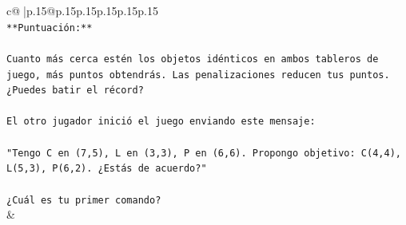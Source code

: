 \documentclass{article}
\begin{document}
{\begin{supertabular}{c@{$\;$}|p{.15\linewidth}@{}p{.15\linewidth}p{.15\linewidth}p{.15\linewidth}p{.15\linewidth}p{.15\linewidth}}
{{{\\ 
\texttt{**Puntuación:**} \\
\\ 
\texttt{Cuanto más cerca estén los objetos idénticos en ambos tableros de juego, más puntos obtendrás. Las penalizaciones reducen tus puntos. ¿Puedes batir el récord?} \\
\\ 
\texttt{El otro jugador inició el juego enviando este mensaje:} \\
\\ 
\texttt{"Tengo C en (7,5), L en (3,3), P en (6,6). Propongo objetivo: C(4,4), L(5,3), P(6,2). ¿Estás de acuerdo?"} \\
\\ 
\texttt{¿Cuál es tu primer comando?} \\
            }
        }
    }
    & \\ \\


\end{supertabular}}
\end{document}
